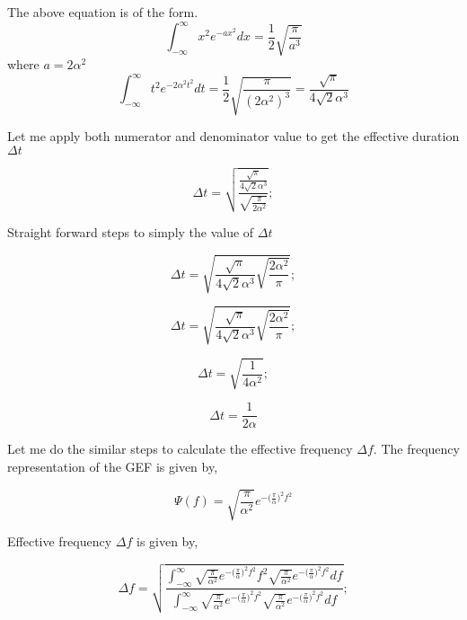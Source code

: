 The above equation is of the form.
\begin{equation*}
\int_{-\infty}^{\infty}x^2 e^{- ax^2 }dx = \frac{1}{2}\sqrt{\frac{\pi}{a^3}}
\end{equation*}
where $a = 2\alpha ^ 2$
\begin{equation*}
\int_{-\infty}^{\infty}{t^2 e^{-2\alpha ^2 t^2} dt} = \frac{1}{2} \sqrt{\frac{\pi}{({2\alpha ^2})^3}} = \frac{\sqrt{\pi}}{4 \sqrt{2}\alpha ^3}
\end{equation*}

Let me apply both numerator and denominator value to get the effective duration $\Delta t$

\begin{equation*}
\Delta t = \sqrt{\frac{\frac{\sqrt{\pi}}{4 \sqrt{2}\alpha ^3}}{\sqrt{\frac{\pi}{2\alpha ^ 2}}}} ;
\end{equation*}

Straight forward steps to simply the value of $\Delta t$

\begin{equation*}
\Delta t =  \sqrt{\frac{\sqrt{\pi}}{4 \sqrt{2}\alpha ^3}{\sqrt{\frac{2\alpha ^ 2}{\pi}}}} ;
\end{equation*}

\begin{equation*}
\Delta t =  \sqrt{\frac{\sqrt{\pi}}{4 \sqrt{2}\alpha ^3}{\sqrt{\frac{2\alpha ^ 2}{\pi}}}} ;
\end{equation*}

\begin{equation*}
\Delta t =  \sqrt{\frac{1}{4 \alpha ^2}};
\end{equation*}


\begin{equation}
\Delta t =  \frac{1}{2 \alpha }
\end{equation}

Let me do the similar steps to calculate the effective frequency $\Delta f$. The frequency representation of the GEF is given by,

\begin{equation*}
\Psi(f) = \sqrt{\frac{\pi}{\alpha ^2}} e^{-{(\frac{\pi} {\alpha}})^2 f^2}
\end{equation*}

Effective frequency $\Delta f$ is given by,

\begin{equation*}
\Delta f = \sqrt{\frac{\int_{-\infty}^{\infty}{\sqrt{\frac{\pi}{\alpha ^2}} e^{-{(\frac{\pi} {\alpha}})^2 f^2} f^2 \sqrt{\frac{\pi}{\alpha ^2}} e^{-{(\frac{\pi} {\alpha}})^2 f^2} df}}{\int_{-\infty}^{\infty}{\sqrt{\frac{\pi}{\alpha ^2}} e^{-{(\frac{\pi} {\alpha}})^2 f^2}  \sqrt{\frac{\pi}{\alpha ^2}} e^{-{(\frac{\pi} {\alpha}})^2 f^2} df}}} ;
\end{equation*}

